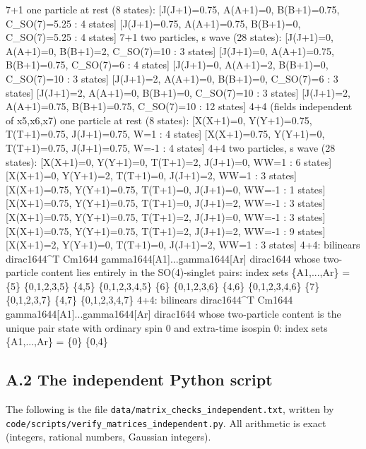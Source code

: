 \documentclass[
  10pt,
]{article}
\newenvironment{Shaded}{}{}
\newcommand{\NormalTok}[1]{#1}
\begin{document}
\begin{Shaded}
\begin{Highlighting}[]
\NormalTok{7+1 one particle at rest (8 states): [J(J+1)=0.75, A(A+1)=0, B(B+1)=0.75, C\_SO(7)=5.25 : 4 states] [J(J+1)=0.75, A(A+1)=0.75, B(B+1)=0, C\_SO(7)=5.25 : 4 states] }
\NormalTok{7+1 two particles, s wave (28 states): [J(J+1)=0, A(A+1)=0, B(B+1)=2, C\_SO(7)=10 : 3 states] [J(J+1)=0, A(A+1)=0.75, B(B+1)=0.75, C\_SO(7)=6 : 4 states] [J(J+1)=0, A(A+1)=2, B(B+1)=0, C\_SO(7)=10 : 3 states] [J(J+1)=2, A(A+1)=0, B(B+1)=0, C\_SO(7)=6 : 3 states] [J(J+1)=2, A(A+1)=0, B(B+1)=0, C\_SO(7)=10 : 3 states] [J(J+1)=2, A(A+1)=0.75, B(B+1)=0.75, C\_SO(7)=10 : 12 states] }
\NormalTok{4+4 (fields independent of x5,x6,x7) one particle at rest (8 states): [X(X+1)=0, Y(Y+1)=0.75, T(T+1)=0.75, J(J+1)=0.75, W=1 : 4 states] [X(X+1)=0.75, Y(Y+1)=0, T(T+1)=0.75, J(J+1)=0.75, W={-}1 : 4 states] }
\NormalTok{4+4 two particles, s wave (28 states): [X(X+1)=0, Y(Y+1)=0, T(T+1)=2, J(J+1)=0, WW=1 : 6 states] [X(X+1)=0, Y(Y+1)=2, T(T+1)=0, J(J+1)=2, WW=1 : 3 states] [X(X+1)=0.75, Y(Y+1)=0.75, T(T+1)=0, J(J+1)=0, WW={-}1 : 1 states] [X(X+1)=0.75, Y(Y+1)=0.75, T(T+1)=0, J(J+1)=2, WW={-}1 : 3 states] [X(X+1)=0.75, Y(Y+1)=0.75, T(T+1)=2, J(J+1)=0, WW={-}1 : 3 states] [X(X+1)=0.75, Y(Y+1)=0.75, T(T+1)=2, J(J+1)=2, WW={-}1 : 9 states] [X(X+1)=2, Y(Y+1)=0, T(T+1)=0, J(J+1)=2, WW=1 : 3 states] }
\NormalTok{4+4: bilinears dirac1644\^{}T Cm1644 gamma1644[A1]...gamma1644[Ar] dirac1644 whose two{-}particle content lies entirely in the SO(4){-}singlet pairs: index sets \{A1,...,Ar\} = \{5\} \{0,1,2,3,5\} \{4,5\} \{0,1,2,3,4,5\} \{6\} \{0,1,2,3,6\} \{4,6\} \{0,1,2,3,4,6\} \{7\} \{0,1,2,3,7\} \{4,7\} \{0,1,2,3,4,7\}}
\NormalTok{4+4: bilinears dirac1644\^{}T Cm1644 gamma1644[A1]...gamma1644[Ar] dirac1644 whose two{-}particle content is the unique pair state with ordinary spin 0 and extra{-}time isospin 0: index sets \{A1,...,Ar\} = \{0\} \{0,4\}}
\end{Highlighting}
\end{Shaded}

\hypertarget{a.2-the-independent-python-script}{%
\subsection{A.2 The independent Python
script}\label{a.2-the-independent-python-script}}

The following is the file \texttt{data/matrix\_checks\_independent.txt},
written by \texttt{code/scripts/verify\_matrices\_independent.py}. All
arithmetic is exact (integers, rational numbers, Gaussian integers).
\end{document}
